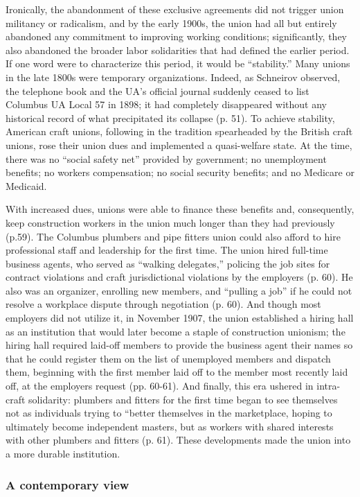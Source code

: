 Ironically, the abandonment of these exclusive agreements did not trigger union militancy or radicalism, and by the early 1900s, the union had all but entirely abandoned any commitment to improving working conditions; significantly, they also abandoned the broader labor solidarities that had defined the earlier period. If one word were to characterize this period, it would be “stability.” Many unions in the late 1800s were temporary organizations. Indeed, as Schneirov observed, the telephone book and the UA’s official journal suddenly ceased to list Columbus UA Local 57 in 1898; it had completely disappeared without any historical record of what precipitated its collapse (p. 51). To achieve stability, American craft unions, following in the tradition spearheaded by the British craft unions, rose their union dues and implemented a quasi-welfare state. At the time, there was no “social safety net” provided by government; no unemployment benefits; no workers compensation; no social security benefits; and no Medicare or Medicaid. 

With increased dues, unions were able to finance these benefits and, consequently, keep construction workers in the union much longer than they had previously (p.59). The Columbus plumbers and pipe fitters union could also afford to hire professional staff and leadership for the first time. The union hired full-time business agents, who served as “walking delegates,” policing the job sites for contract violations and craft jurisdictional violations by the employers (p. 60). He also was an organizer, enrolling new members, and “pulling a job” if he could not resolve a workplace dispute through negotiation (p. 60). And though most employers did not utilize it, in November 1907, the union established a hiring hall as an institution that would later become a staple of construction unionism; the hiring hall required laid-off members to provide the business agent their names so that he could register them on the list of unemployed members and dispatch them, beginning with the first member laid off to the member most recently laid off, at the employers request (pp. 60-61). And finally, this era ushered in intra-craft solidarity: plumbers and fitters for the first time began to see themselves not as individuals trying to “better themselves in the marketplace, hoping to ultimately become independent masters, but as workers with shared interests with other plumbers and fitters (p. 61). These developments made the union into a more durable institution.

\subsubsection{A contemporary view} \

